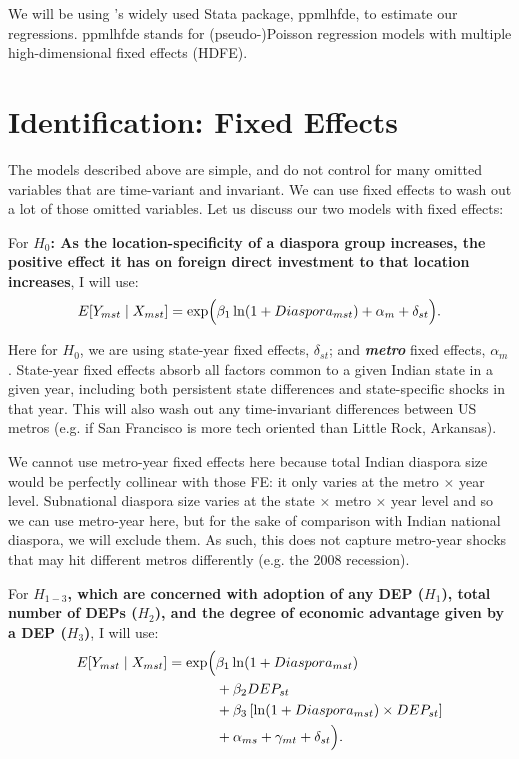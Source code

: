 \documentclass[doublespace,nopageskip]{UVAthesis}
\begin{document}
We will be using \citet{correia_fast_2020}'s widely used Stata package, ppmlhfde, to estimate our regressions. ppmlhfde stands for (pseudo-)Poisson regression models with multiple high-dimensional fixed effects (HDFE).

\section{Identification: Fixed Effects}

The models described above are simple, and do not control for many omitted variables that are time-variant and invariant. We can use fixed effects to wash out a lot of those omitted variables. Let us discuss our two models with fixed effects:

For \textbf{$H_0$:  As the location-specificity of a diaspora group increases, the positive effect it has on foreign direct investment to that location increases}, I will use:
\[
E[Y_{mst} \mid X_{mst}] =
\exp \Bigl(
\beta_1 \ln(1+Diaspora_{mst})
+ \alpha_{m}
+ \delta_{st}
\Bigr).
\]

Here for $H_0$, we are using state-year fixed effects, $\delta_{st}$; and \textbf{\textit{metro}} fixed effects, $\alpha_{m}$. State-year fixed effects absorb all factors common to a given Indian state in a given year, including both persistent state differences and state-specific shocks in that year. This will also wash out any time-invariant differences between US metros (e.g. if San Francisco is more tech oriented than Little Rock, Arkansas).

We cannot use metro-year fixed effects here because total Indian diaspora size would be perfectly collinear with those FE: it only varies at the metro $\times$ year level. Subnational diaspora size varies at the state $\times$ metro $\times$ year level and so we can use metro-year here, but for the sake of comparison with Indian national diaspora, we will exclude them. As such, this does not capture metro-year shocks that may hit different metros differently (e.g. the 2008 recession). 

For \textbf{$H_{1-3}$, which are concerned with adoption of any DEP ($H_1$), total number of DEPs ($H_2$), and the degree of economic advantage given by a DEP ($H_3$)}, I will use:
\[
\begin{aligned}
E[Y_{mst} \mid X_{mst}] =
\exp \Bigl(
&\beta_1 \ln(1+Diaspora_{mst}) \\
&+ \beta_2 DEP_{st} \\
&+ \beta_3 \left[\ln(1+Diaspora_{mst}) \times DEP_{st}\right] \\
&+ \alpha_{ms}
+ \gamma_{mt}
+ \delta_{st}
\Bigr).
\end{aligned}
\]
\end{document}
